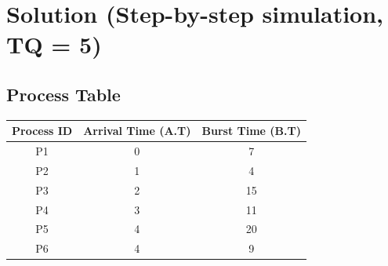 \documentclass[12pt, a4paper]{article}
\begin{document}
\section*{Solution (Step-by-step simulation, TQ = 5)}

\subsection*{Process Table}
\begin{table}[H]
    \centering
    \renewcommand{\arraystretch}{1.3}
    \begin{tabular}{|c|c|c|}
        \hline
        \textbf{Process ID} & \textbf{Arrival Time (A.T)} & \textbf{Burst Time (B.T)} \\
        \hline
        P1 & 0 & 7 \\
        P2 & 1 & 4 \\
        P3 & 2 & 15 \\
        P4 & 3 & 11 \\
        P5 & 4 & 20 \\
        P6 & 4 & 9 \\
        \hline
    \end{tabular}
\end{table}
\end{document}
